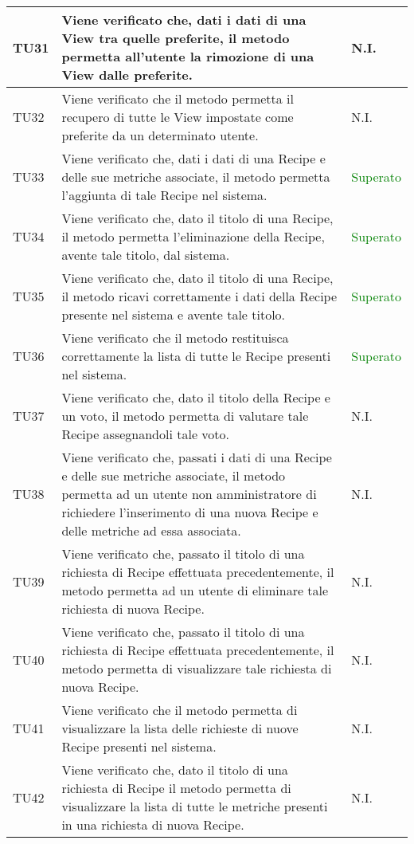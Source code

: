 \begin{center}
\begin{longtable}{| p{2cm} | p{8cm} | p{2.5cm} |}
					\hline
					TU31 & Viene verificato che, dati i dati di una View tra quelle preferite, il metodo permetta all'utente la rimozione di una View dalle preferite. & N.I.\\
					\hline
					TU32 & Viene verificato che il metodo permetta il recupero di tutte le View impostate come preferite da un determinato utente. & N.I.\\
					\hline
					TU33 & Viene verificato che, dati i dati di una Recipe e delle sue metriche associate, il metodo permetta l'aggiunta di tale Recipe nel sistema. & \textcolor{green}{Superato}\\
					\hline
					TU34 & Viene verificato che, dato il titolo di una Recipe, il metodo permetta l'eliminazione della Recipe, avente tale titolo, dal sistema. & \textcolor{green}{Superato}\\
					\hline
					TU35 & Viene verificato che, dato il titolo di una Recipe, il metodo ricavi correttamente i dati della Recipe presente nel sistema e avente tale titolo. & \textcolor{green}{Superato}\\
					\hline
					TU36 & Viene verificato che il metodo restituisca correttamente la lista di tutte le Recipe presenti nel sistema. & \textcolor{green}{Superato}\\
					\hline
					TU37 & Viene verificato che, dato il titolo della Recipe e un voto, il metodo permetta di valutare tale Recipe assegnandoli tale voto. & N.I.\\
					\hline
					TU38 & Viene verificato che, passati i dati di una Recipe e delle sue metriche associate, il metodo permetta ad un utente non amministratore di richiedere l'inserimento di una nuova Recipe e delle metriche ad essa associata. & N.I.\\
					\hline
					TU39 & Viene verificato che, passato il titolo di una richiesta di Recipe effettuata precedentemente, il metodo permetta ad un utente di eliminare tale richiesta di nuova Recipe. & N.I.\\
					\hline
					TU40 & Viene verificato che, passato il titolo di una richiesta di Recipe effettuata precedentemente, il metodo permetta di visualizzare tale richiesta di nuova Recipe. & N.I.\\
					\hline
					TU41 & Viene verificato che il metodo permetta di visualizzare la lista delle richieste di nuove Recipe presenti nel sistema. & N.I.\\
					\hline
					TU42 & Viene verificato che, dato il titolo di una richiesta di Recipe il metodo permetta di visualizzare la lista di tutte le metriche presenti in una richiesta di nuova Recipe. & N.I.\\

\end{longtable}
\end{center}
